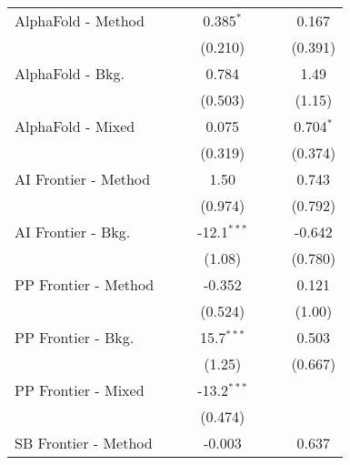 \begin{tabular}{lcccccc}
   AlphaFold - Method             &               &               & 0.385$^{*}$   &              &         & 0.167\\   
                                  &               &               & (0.210)       &              &         & (0.391)\\   
   AlphaFold - Bkg.               &               &               & 0.784         &              &         & 1.49\\   
                                  &               &               & (0.503)       &              &         & (1.15)\\   
   AlphaFold - Mixed              &               &               & 0.075         &              &         & 0.704$^{*}$\\   
                                  &               &               & (0.319)       &              &         & (0.374)\\   
   AI Frontier - Method           &               &               & 1.50          &              &         & 0.743\\   
                                  &               &               & (0.974)       &              &         & (0.792)\\   
   AI Frontier - Bkg.             &               &               & -12.1$^{***}$ &              &         & -0.642\\   
                                  &               &               & (1.08)        &              &         & (0.780)\\   
   PP Frontier - Method           &               &               & -0.352        &              &         & 0.121\\   
                                  &               &               & (0.524)       &              &         & (1.00)\\   
   PP Frontier - Bkg.             &               &               & 15.7$^{***}$  &              &         & 0.503\\   
                                  &               &               & (1.25)        &              &         & (0.667)\\   
   PP Frontier - Mixed            &               &               & -13.2$^{***}$ &              &         &   \\   
                                  &               &               & (0.474)       &              &         &   \\   
   SB Frontier - Method           &               &               & -0.003        &              &         & 0.637\\   

\end{tabular}
